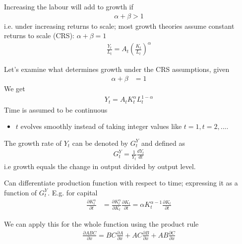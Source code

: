 \documentclass{beamer}
\begin{document}
\begin{frame}
 Increasing the labour will add to growth if 
 \begin{align}
   \alpha+\beta>1
 \end{align}
 \medskip
 i.e. under increasing returns to scale; most growth theories assume constant returns to scale (CRS): $\alpha+\beta = 1$
 \begin{align}   
   \frac{Y_t}{L_t} = A_t \left(\frac{K_t}{L_t}\right)^{\alpha}
 \end{align}
\end{frame}


\begin{frame}
  Let's examine what determines growth under the CRS assumptions, given   
  \begin{align}
   \alpha+\beta &= 1
  \end{align}
  We get
  \begin{align}
    Y_t=A_tK^{\alpha}_tL^{1-\alpha}_t
  \end{align}
  \medskip
  Time is assumed to be continuous
  \begin{itemize}
    \item $t$ evolves smoothly instead of taking integer values like $t=1,t=2,...$.
  \end{itemize}
  \medskip
  The growth rate of $Y_t$ can be denoted by $G^Y_t$ and defined as
  \begin{align}
    G^Y_t=\frac{1}{Y_t}\frac{dY_t}{dt}
  \end{align}
  i.e growth equals the change in output divided by output level.
\end{frame}

\begin{frame}
  Can differentiate production function with respect to time; expressing it as a function of $G^Y_t$.
  E.g. for capital 
  \begin{align}
    \frac{\partial K_t^{\alpha}}{\partial t} &= \frac{\partial K_t^{\alpha}}{\partial K_t}\frac{\partial K_t}{\partial t} =\alpha K_t^{\alpha-1}\frac{\partial K_t}{\partial t}
  \end{align}
\end{frame}

\begin{frame}
  We can apply this for the whole function using the product rule
  \begin{align}
  \frac{\partial ABC}{\partial x}=BC\frac{\partial A}{\partial x}+AC\frac{\partial B}{\partial x}+AB\frac{\partial C}{\partial x}
\end{align}
\end{frame}
\end{document}
